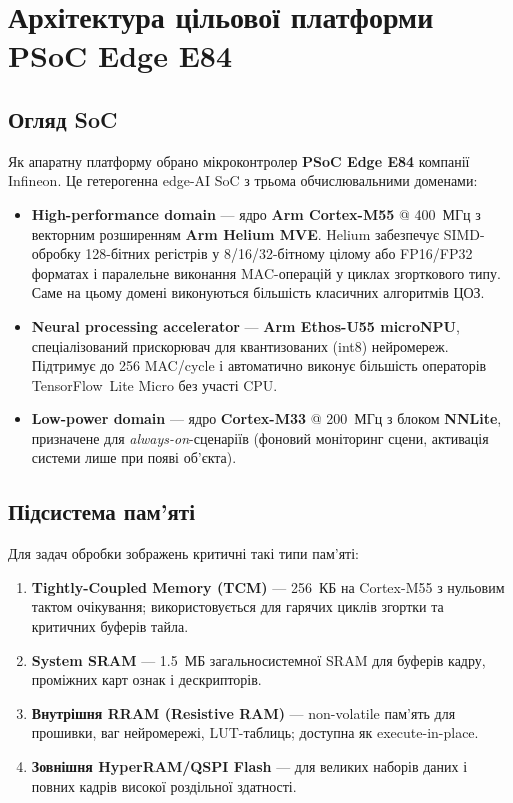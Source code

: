 \documentclass[a4paper,12pt]{article}
\let\oldsection\section
\renewcommand{\section}{\clearpage\oldsection}
\begin{document}
\section{Архітектура цільової платформи PSoC\texttrademark{} Edge E84}

\subsection{Огляд SoC}

Як апаратну платформу обрано мікроконтролер \textbf{PSoC\texttrademark{} Edge E84} компанії Infineon. Це гетерогенна edge-AI SoC з трьома обчислювальними доменами:

\begin{itemize}
	\item \textbf{High-performance domain} --- ядро \textbf{Arm Cortex-M55} @ 400~МГц з векторним розширенням \textbf{Arm Helium\texttrademark{} MVE}. Helium забезпечує SIMD-обробку 128-бітних регістрів у 8/16/32-бітному цілому або FP16/FP32 форматах і паралельне виконання MAC-операцій у циклах згорткового типу. Саме на цьому домені виконуються більшість класичних алгоритмів ЦОЗ.

	\item \textbf{Neural processing accelerator} --- \textbf{Arm Ethos-U55 microNPU}, спеціалізований прискорювач для квантизованих (int8) нейромереж. Підтримує до 256 MAC/cycle і автоматично виконує більшість операторів TensorFlow~Lite Micro без участі CPU.

	\item \textbf{Low-power domain} --- ядро \textbf{Cortex-M33} @ 200~МГц з блоком \textbf{NNLite}, призначене для \textit{always-on}-сценаріїв (фоновий моніторинг сцени, активація системи лише при появі об'єкта).
\end{itemize}

\subsection{Підсистема пам'яті}

Для задач обробки зображень критичні такі типи пам'яті:
\begin{enumerate}
	\item \textbf{Tightly-Coupled Memory (TCM)} --- 256~КБ на Cortex-M55 з нульовим тактом очікування; використовується для гарячих циклів згортки та критичних буферів тайла.
	\item \textbf{System SRAM} --- 1.5~МБ загальносистемної SRAM для буферів кадру, проміжних карт ознак і дескрипторів.
	\item \textbf{Внутрішня RRAM (Resistive RAM)} --- non-volatile пам'ять для прошивки, ваг нейромережі, LUT-таблиць; доступна як execute-in-place.
	\item \textbf{Зовнішня HyperRAM/QSPI Flash} --- для великих наборів даних і повних кадрів високої роздільної здатності.
\end{enumerate}
\end{document}
